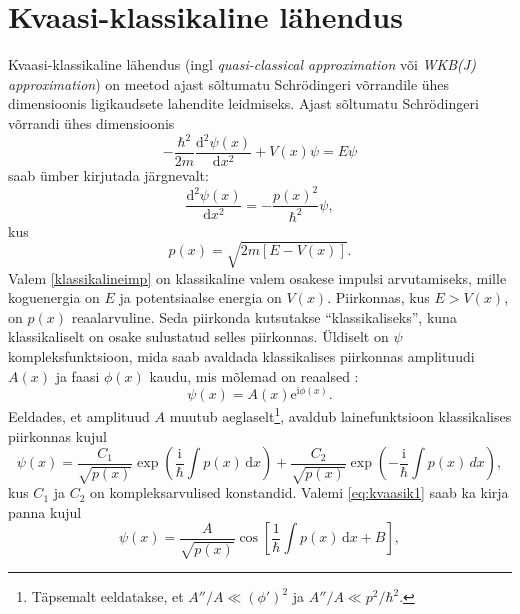 \documentclass{trkut}%
\begin{document}
\section{Kvaasi-klassikaline lähendus}
Kvaasi-klassikaline lähendus (ingl \textit{quasi-classical approximation} või \textit{WKB(J) approximation}) on meetod ajast sõltumatu Schrödingeri võrrandile ühes dimensioonis ligikaudsete lahendite leidmiseks.
Ajast sõltumatu Schrödingeri võrrandi ühes dimensioonis
\begin{equation}
    -\frac{\hbar^2}{2m}\frac{\mathrm{d}^2\psi(x)}{\mathrm{d}x^2}+V(x)\psi=E\psi
\end{equation}
saab ümber kirjutada järgnevalt:
\begin{equation}
    \frac{\mathrm{d}^2 \psi(x)}{\mathrm{d}x^2}= - \frac{p(x)^2}{\hbar^2}\psi,
\end{equation}
kus
\begin{equation} \label{klassikalineimp}
    p(x) = \sqrt{2m[E-V(x)]}.
\end{equation}
Valem \eqref{klassikalineimp} on klassikaline valem osakese impulsi arvutamiseks, mille koguenergia on $E$ ja potentsiaalse energia on $V(x)$.
Piirkonnas, kus $E>V(x)$, on $p(x)$ reaalarvuline.
Seda piirkonda kutsutakse \enquote{klassikaliseks}, kuna klassikaliselt on osake sulustatud selles piirkonnas.
Üldiselt on $\psi$ kompleksfunktsioon, mida saab avaldada klassikalises piirkonnas amplituudi $A(x)$ ja faasi $\phi(x)$ kaudu, mis mõlemad on reaalsed \parencite[316]{griffiths05}:
\begin{equation}
    \psi(x)=A(x)\mathrm{e}^{\mathrm{i}\phi(x)}.
\end{equation}
Eeldades, et amplituud $A$ muutub aeglaselt\footnote{Täpsemalt eeldatakse, et $A''/A\ll(\phi ')^2$ ja $A''/A\ll p^2/\hbar^2$.}, avaldub lainefunktsioon klassikalises piirkonnas kujul \parencite[316-318]{griffiths05}
\begin{equation}
    \psi(x) = \frac{C_1}{\sqrt{p(x)}}\exp\left(\frac{\mathrm{i}}{\hbar}\int p(x)\, \mathrm{d}x\right) +\frac{C_2}{\sqrt{p(x)}}\exp\left(-\frac{\mathrm{i}}{\hbar}\int p(x)\, dx\right),
    \label{eq:kvaasik1}
\end{equation}
kus $C_1$ ja $C_2$ on kompleksarvulised konstandid.
Valemi \eqref{eq:kvaasik1} saab ka kirja panna kujul \parencite[446]{shankar94}
\begin{equation}
    \psi(x)=\frac{A}{\sqrt{p(x)}} \cos \left[ \frac{1}{\hbar}\int p(x)\, \mathrm{d}x + B \right],
    \label{eq:kvaasik2}
\end{equation}
\end{document}
